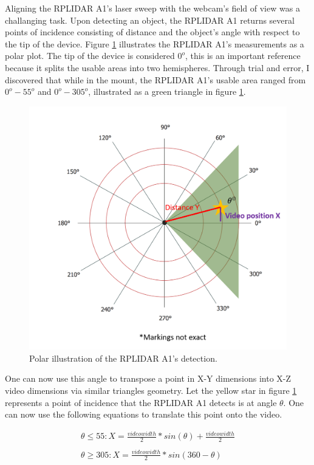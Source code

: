 \documentclass[onecolumn, draftclsnofoot,10pt, compsoc]{IEEEtran}
\makeatletter
\newcommand\captionof[1]{\def\@captype{#1}\caption}
\makeatother
\begin{document}
\begin{singlespace}
		Aligning the RPLIDAR A1's laser sweep with the webcam's field of view was a challanging task.
		Upon detecting an object, the RPLIDAR A1 returns several points of incidence consisting of distance and the object's angle with respect to the tip of the device.
		Figure \ref{polar} illustrates the RPLIDAR A1's measurements as a polar plot.
		The tip of the device is considered \( 0^o \), this is an important reference because it splits the usable areas into two hemispheres.
		Through trial and error, I discovered that while in the mount, the RPLIDAR A1's usable area ranged from \( 0^o - 55^o\) and \( 0^o - 305^o\), illustrated as a green triangle in figure \ref{polar}.

		\begin{figure}[H]
		\includegraphics[scale=0.4]{polar.png}
		\captionof{figure}{Polar illustration of the RPLIDAR A1's detection.}
		\label{polar}
		\end{figure}


		One can now use this angle to transpose a point in X-Y dimensions into X-Z video dimensions via similar triangles geometry.
		Let the yellow star in figure \ref{polar} represents a point of incidence that the RPLIDAR A1 detects is at angle \( \theta\).
		One can now use the following equations to translate this point onto the video.


\begin{equation} \label{eq1}
\begin{aligned}
\theta \leq  55:
X = \frac{video width}{2} * sin(\theta) + \frac{video width}{2}\\
\\
\theta \geq 305:
X = \frac{video width}{2} * sin(360 - \theta)\\
\end{aligned}
\end{equation}


\end{singlespace}
\end{document}
